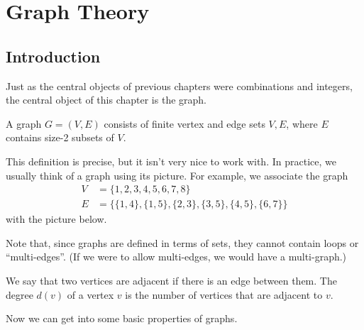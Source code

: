 \documentclass[../m055main.tex]{subfiles}
\begin{document}
\chapter{Graph Theory}

\section{Introduction}
Just as the central objects of previous chapters were combinations and integers, the central object of this chapter is the graph.

\begin{definition}[Graph]
    A graph $G = (V,E)$ consists of finite vertex and edge sets $V,E$, where $E$ contains size-2 subsets of $V$.
\end{definition}

This definition is precise, but it isn't very nice to work with.
In practice, we usually think of a graph using its picture.
For example, we associate the graph
\begin{align*}
    V &= \{ 1, 2, 3, 4, 5, 6, 7, 8 \} \\
    E &= \Big\{ \{ 1,4 \}, \{ 1,5 \}, \{ 2,3 \}, \{ 3,5 \}, \{ 4,5 \}, \{ 6,7 \} \Big\}
\end{align*}
with the picture below.

\begin{center}
\end{center}

Note that, since graphs are defined in terms of sets, they cannot contain loops or ``multi-edges''.
(If we were to allow multi-edges, we would have a multi-graph.)

We say that two vertices are adjacent if there is an edge between them.
The degree $d(v)$ of a vertex $v$ is the number of vertices that are adjacent to $v$.

Now we can get into some basic properties of graphs.
\end{document}
